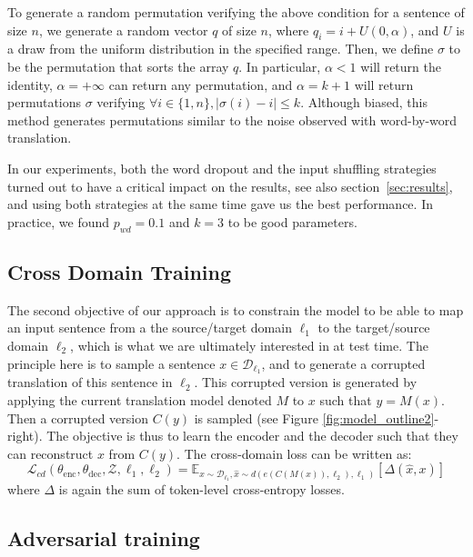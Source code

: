 To generate a random permutation verifying the above condition for a sentence of size $n$, we generate a random vector $q$ of size $n$, where $q_i = i + U(0, \alpha)$, and $U$ is a draw from the uniform distribution in the specified range. Then, we define $\sigma$ to be the permutation that sorts the array $q$. In particular, $\alpha < 1$ will return the identity, $\alpha = +\infty$ can return any permutation, and $\alpha = k + 1$ will return permutations $\sigma$ verifying $\forall i \in \{1, n\}, | \sigma (i) - i | \leq k$. Although biased, this method generates permutations similar to the noise observed with word-by-word translation.

In our experiments, both the word dropout and the input shuffling strategies turned out to have a critical impact on the results, see also section~\ref{sec:results}, and using both strategies at the same time gave us the best performance. In practice, we found $p_{wd}=0.1$ and $k=3$ to be good parameters.

\subsection{Cross Domain Training}

 The second objective of our approach is to constrain the model to be able to map an input sentence from a the source/target domain $\ell_1$ to the target/source domain $\ell_2$, which is what we are ultimately interested in at test time. The principle here is to sample a sentence $x \in \mathcal{D}_{\ell_1}$, and to generate a corrupted translation of this sentence in $\ell_2$. This corrupted version is generated by applying the current translation model denoted $M$ to $x$ such that $y=M(x)$. Then a corrupted version $C(y)$ is sampled (see Figure \ref{fig:model_outline2}-right). The objective is thus to learn the encoder and the decoder such that they can reconstruct $x$ from $C(y)$. The cross-domain loss can be written as:
\begin{equation}
    \mathcal{L}_{cd}(\theta_\mathrm{enc},\theta_\mathrm{dec},\mathcal{Z},\ell_1,\ell_2)=\mathbb{E}_{x \sim \mathcal{D}_{\ell_1},\hat{x} \sim d(e(C(M(x)),\ell_2),\ell_1)} \left[ \Delta(\hat{x},x) \right] 
    \label{eq:xdomain}
\end{equation}
where $\Delta$ is again the sum of token-level cross-entropy losses.


\subsection{Adversarial training}

